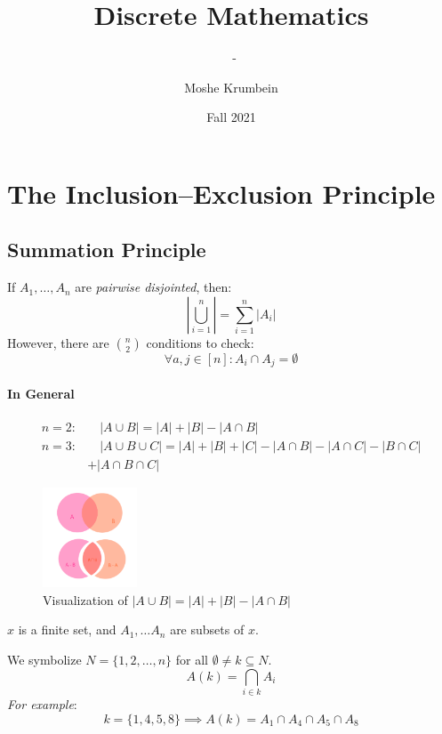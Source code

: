 \documentclass[00_complete]{subfiles}
\title{Discrete Mathematics}
\author{Moshe Krumbein}
\date{Fall 2021}
\begin{document}
\setcounter{chapter}{6}

\chapter{The Inclusion–Exclusion Principle}
\subtitle{\theauthor~- \thedate}

\section{Summation Principle}

\begin{theorem}
    If $A_1,\dots,A_n$ are \emph{pairwise disjointed}, then:
    $$\left|\bigcup_{i=1}^n\right| = \sum_{i=1}^{n}|A_i|$$
    However, there are $\binom{n}{2}$ conditions to check:
    $$\forall a,j \in [n]: A_i \cap A_j = \emptyset$$
\end{theorem}

\subsubsection{In General}

$$
\begin{aligned}
    n=2:& \quad|A \cup B| = |A| + |B| - |A \cap B| \\
    n=3:& \quad|A \cup B \cup C| = |A| + |B| + |C| - |A \cap B| - |A \cap C| - |B \cap
C| \\&+ |A \cap B \cap C|
\end{aligned}$$

\begin{figure}[ht]
  \centering
    \includegraphics[width=0.25\textwidth]{w7_venn1}
    \caption{Visualization of $|A \cup B| = |A| + |B| - |A \cap B|$}
\end{figure}

\begin{symbols}
    $x$ is a finite set, and $A_1,\dots A_n$ are subsets of $x$.

    We symbolize $N=\{1,2,\dots,n\}$ for all $\emptyset \neq k \subseteq N$.
    $$A(k) = \bigcap_{i \in k}A_i$$
    \emph{For example}:
    $$k = \{1,4,5,8\} \implies A(k) = A_1 \cap A_4 \cap A_5 \cap A_8$$
\end{symbols}
\end{document}
